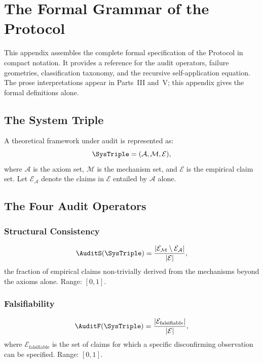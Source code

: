 
\chapter{The Formal Grammar of the \Ortyx{} Protocol}
\label{app:grammar}

\noindent
This appendix assembles the complete formal specification
of the \Ortyx{} Protocol in compact notation. It provides
a reference for the audit operators, failure geometries,
classification taxonomy, and the recursive self-application
equation. The prose interpretations appear in Parts~III
and~V; this appendix gives the formal definitions alone.

\section{The System Triple}
\label{app-g:triple}

A theoretical framework under audit is represented as:
\[
  \SysTriple = (\mathcal{A}, \mathcal{M}, \mathcal{E}),
\]
where $\mathcal{A}$ is the axiom set, $\mathcal{M}$
is the mechanism set, and $\mathcal{E}$ is the empirical
claim set. Let $\mathcal{E}_{\mathcal{A}}$ denote the
claims in $\mathcal{E}$ entailed by $\mathcal{A}$ alone.

\section{The Four Audit Operators}
\label{app-g:operators}

\subsection{Structural Consistency}
\[
  \AuditS(\SysTriple)
  = \frac{|\mathcal{E}_{\mathcal{M}} \setminus \mathcal{E}_{\mathcal{A}}|}{|\mathcal{E}|},
\]
the fraction of empirical claims non-trivially derived
from the mechanisms beyond the axioms alone. Range: $[0,1]$.

\subsection{Falsifiability}
\[
  \AuditF(\SysTriple)
  = \frac{|\mathcal{E}_{\mathrm{falsifiable}}|}{|\mathcal{E}|},
\]
where $\mathcal{E}_{\mathrm{falsifiable}}$ is the set
of claims for which a specific disconfirming observation
can be specified. Range: $[0,1]$.

